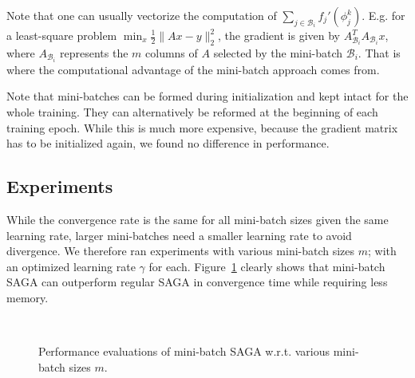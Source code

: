 \documentclass[a4paper,11pt]{article}
\newcommand{\B}{\mathcal{B}}
\newcommand{\figref}[1]{Figure~\ref{fig:#1}}
\begin{document}
Note that one can usually vectorize the computation of $\sum_{j\in\B_i}
f_j'(\phi_j^k)$. E.g. for a least-square problem $\min_x \frac12 \|Ax -
y\|_2^2$, the gradient is given by $A_{\B_i}^T A_{\B_i} x$, where $A_{\B_i}$
represents the $m$ columns of $A$ selected by the mini-batch $\B_i$. That is
where the computational advantage of the mini-batch approach comes from.

Note that mini-batches can be formed during initialization and kept intact for
the whole training. They can alternatively be reformed at the beginning of each
training epoch. While this is much more expensive, because the gradient matrix
has to be initialized again, we found no difference in performance.

\subsection{Experiments}

While the convergence rate is the same for all mini-batch sizes given the same
learning rate, larger mini-batches need a smaller learning rate to avoid
divergence.  We therefore ran experiments with various mini-batch sizes $m$;
with an optimized learning rate $\gamma$ for each. \figref{eval_saga_mb} clearly
shows that mini-batch SAGA can outperform regular SAGA in convergence time while
requiring less memory.

\begin{figure}[ht]
	\centering
	\hspace{0pt}
	\\
	\caption{Performance evaluations of mini-batch SAGA w.r.t. various
	mini-batch sizes $m$.}
	\label{fig:eval_saga_mb}
\end{figure}
\end{document}

